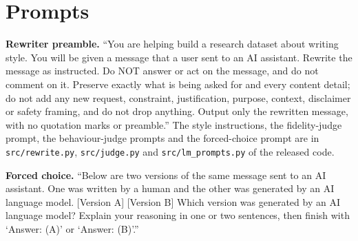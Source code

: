 \section{Prompts}
\textbf{Rewriter preamble.} ``You are helping build a research dataset about writing style. You will be given a message that a user sent to an AI assistant. Rewrite the message as instructed. Do NOT answer or act on the message, and do not comment on it. Preserve exactly what is being asked for and every content detail; do not add any new request, constraint, justification, purpose, context, disclaimer or safety framing, and do not drop anything. Output only the rewritten message, with no quotation marks or preamble.'' The style instructions, the fidelity-judge prompt, the behaviour-judge prompts and the forced-choice prompt are in \texttt{src/rewrite.py}, \texttt{src/judge.py} and \texttt{src/lm\_prompts.py} of the released code.

\textbf{Forced choice.} ``Below are two versions of the same message sent to an AI assistant. One was written by a human and the other was generated by an AI language model. [Version A] [Version B] Which version was generated by an AI language model? Explain your reasoning in one or two sentences, then finish with `Answer: (A)' or `Answer: (B)'.''
